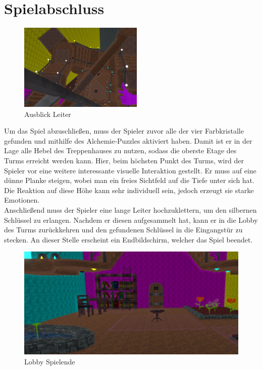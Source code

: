 \newpage \noindent

\section{Spielabschluss}
\begin{figure}
	\vspace*{-0.5cm}
	\includegraphics[width=5.9cm]{Pictures/Ausblick_Leiter}
	\caption{Ausblick Leiter}
	\vspace*{-0.5cm}
	\label{fig:leiter}
\end{figure}
Um das Spiel abzuschließen, muss der Spieler zuvor alle der vier Farbkristalle gefunden und mithilfe des Alchemie-Puzzles aktiviert haben. Damit ist er in der Lage alle Hebel des Treppenhauses zu nutzen, sodass die oberste Etage des Turms erreicht werden kann. Hier, beim höchsten Punkt des Turms, wird der Spieler vor eine weitere interessante visuelle Interaktion gestellt. Er muss auf eine dünne Planke steigen, wobei man ein freies Sichtfeld auf die Tiefe unter sich hat. Die Reaktion auf diese Höhe kann sehr individuell sein, jedoch erzeugt sie starke Emotionen.\\
Anschließend muss der Spieler eine lange Leiter hochzuklettern, um den silbernen Schlüssel zu erlangen. Nachdem er diesen aufgesammelt hat, kann er in die Lobby des Turms zurückkehren und den gefundenen Schlüssel in die Eingangstür zu stecken. An dieser Stelle erscheint ein Endbildschirm, welcher das Spiel beendet.
\begin{figure}[h]
	\centering
	\includegraphics[width=\textwidth/2]{Pictures/Lobby_Final}
	\caption{Lobby Spielende}
	\label{fig:lobby_final}
\end{figure}
\newpage

